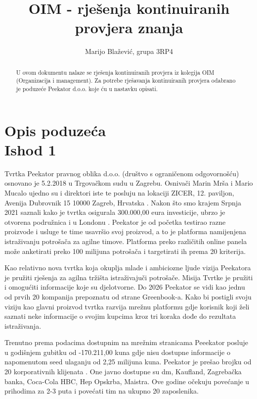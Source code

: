 \documentclass[a4paper]{article}
\title{OIM - rješenja kontinuiranih provjera znanja}
\author{Marijo Blažević, grupa 3RP4}
\begin{document}
	\maketitle
	
	\begin{abstract}
		U ovom dokumentu nalaze se rješenja kontinuiranih provjera iz kolegija OIM (Organizacija i management). Za potrebe rješavanja kontinuiranih provjera odabrano je poduzeće Peekator d.o.o. koje ću u nastavku opisati.
	\end{abstract}

	\section[Section Title. Section Subtitle]{Opis poduzeća\\ {\small Ishod 1}}
	
	Tvrtka Peekator pravnog oblika d.o.o. (društvo s ograničenom odgovornošću) osnovano je 5.2.2018 u Trgovačkom sudu u Zagrebu. Osnivači Marin Mrša i Mario Mucalo ujedno su i direktori iste te posluju na lokaciji ZICER, 12. paviljon, Avenija Dubrovnik 15 10000 Zagreb, Hrvatska \cite{Lokacija}. Nakon što smo krajem Srpnja 2021 saznali kako je tvrtka osigurala 300.000,00 eura investicije, ubrzo je otvorena podružnica i u Londonu \cite{Investicija}. Peekator je od početka testirao razne proizvode i usluge te time usavršio svoj proizvod, a to je platforma namijenjena istraživanju potrošača za agilne timove. Platforma preko različitih online panela može anketirati preko 100 milijuna potrošača i targetirati ih prema 20 kriterija. 
	
	Kao relativno nova tvrtka koja okuplja mlade i ambiciozne ljude vizija Peekatora je pružiti rješenja za agilna tržišta istraživajuči potrošače. Misija Tvrtke je pružiti i omogućiti informacije koje su djelotvorne. Do 2026 Peekator se vidi kao jednu od prvih 20 kompanija prepoznatu od strane Greenbook-a. Kako bi postigli svoju viziju kao glavni proizvod tvrtka razvija mrežnu platformu gdje korisnik koji želi saznati neke informacije o svojim kupcima kroz tri koraka dođe do rezultata istraživanja. 
	
	Trenutno prema podacima dostupnim na mrežnim stranicama Peeekator posluje u godišnjem gubitku od -170.211,00 kuna gdje nisu dostupne informacije o napomenutom seed ulaganju od 2,25 milijuna kuna. Peekator je prešao brojku od 20 korporativnih klijenata \cite{Peekator}. One javno dostupne su dm, Kaufland, Zagrebačka banka, Coca-Cola HBC, Hep Opskrba, Maistra. Ove godine očekuju povećanje u prihodima za 2-3 puta i povećati tim na ukupno 20 zaposlenika.
\end{document}
